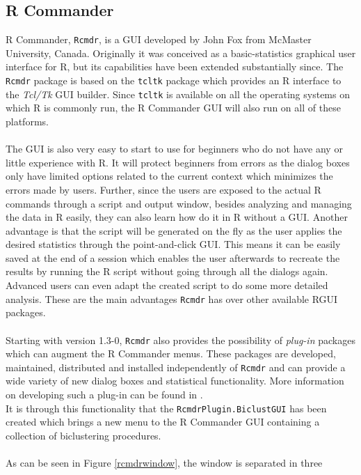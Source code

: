 \documentclass[a4paper]{article}\usepackage[]{graphicx}\usepackage[]{color}
\begin{document}
\subsection{R Commander}
R Commander, \verb|Rcmdr|\citep{Fox2005}, is a GUI developed by John Fox from
McMaster University, Canada. Originally it was conceived as a basic-statistics graphical
user interface for R, but its capabilities have been extended substantially
since. The \verb|Rcmdr| package is based on the \verb|tcltk| package
\citep{Dalgaard2001} which provides an R interface to the {\it Tcl/Tk} GUI builder. 
Since \verb|tcltk| is available on all the operating systems on which R is
commonly run, the R Commander GUI will also run on all of these platforms.\\ \\
The GUI is also very easy to start to use for beginners who do not have any
or little experience with R. It will protect beginners from errors as the dialog
boxes only have limited options related to the current context which minimizes
the errors made by users. Further, since the users are exposed to the actual
R commands through a script and output window, besides analyzing and managing
the data in R easily, they can also learn how do it in R without a GUI.
Another advantage is that the script will be generated on the fly as the user
applies the desired statistics through the point-and-click GUI. This means it can be easily
saved at the end of a session which enables the user afterwards to recreate the
results by running the R script without going through all the dialogs again.
Advanced users can even adapt the created script to do some more detailed
analysis. These are the main advantages \verb|Rcmdr| has over other available
RGUI packages.\\ \\
Starting with version 1.3-0, \verb|Rcmdr| also provides the possibility of {\it
plug-in} packages which can augment the R Commander menus. These packages are
developed, maintained, distributed and installed independently of \verb|Rcmdr|
and can provide a wide variety of new dialog boxes and statistical functionality.
More information on developing such a plug-in can be found in \citet{Fox2007}.\\
It is through this functionality that the \verb|RcmdrPlugin.BiclustGUI| has been
created which brings a new menu to the R Commander GUI containing a collection
of biclustering procedures.
\\ \\
As can be seen in Figure \ref{rcmdrwindow}, the window is separated in three
\end{document}
